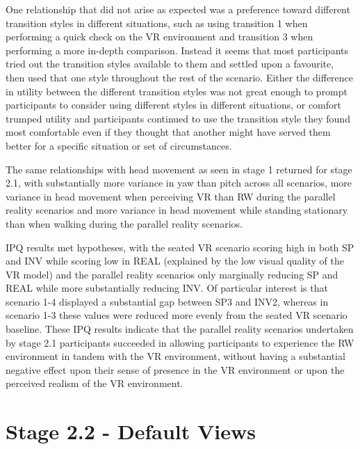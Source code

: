 One relationship that did not arise as expected was a preference toward different transition styles in different situations, such as using transition 1 when performing a quick check on the VR environment and transition 3 when performing a more in-depth comparison. Instead it seems that most participants tried out the transition styles available to them and settled upon a favourite, then used that one style throughout the rest of the scenario. Either the difference in utility between the different transition styles was not great enough to prompt participants to consider using different styles in different situations, or comfort trumped utility and participants continued to use the transition style they found most comfortable even if they thought that another might have served them better for a specific situation or set of circumstances.

The same relationships with head movement as seen in stage 1 returned for stage 2.1, with substantially more variance in yaw than pitch across all scenarios, more variance in head movement when perceiving VR than RW during the parallel reality scenarios and more variance in head movement while standing stationary than when walking during the parallel reality scenarios.

IPQ results met hypotheses, with the seated VR scenario scoring high in both SP and INV while scoring low in REAL (explained by the low visual quality of the VR model) and the parallel reality scenarios only marginally reducing SP and REAL while more substantially reducing INV. Of particular interest is that scenario 1-4 displayed a substantial gap between SP3 and INV2, whereas in scenario 1-3 these values were reduced more evenly from the seated VR scenario baseline. These IPQ results indicate that the parallel reality scenarios undertaken by stage 2.1 participants succeeded in allowing participants to experience the RW environment in tandem with the VR environment, without having a substantial negative effect upon their sense of presence in the VR environment or upon the perceived realism of the VR environment.




\section{Stage 2.2 - Default Views}

